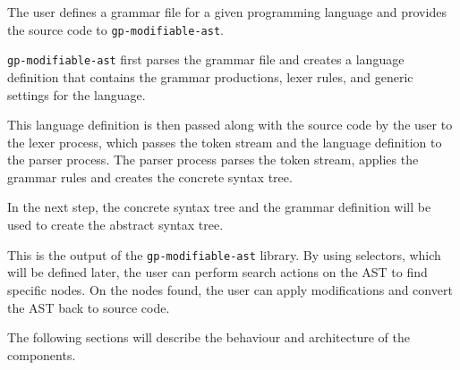 The user defines a grammar file for a given programming language and provides the source code to \verb|gp-modifiable-ast|.

\verb|gp-modifiable-ast| first parses the grammar file and creates a language definition that contains the grammar productions, lexer rules, and generic settings for the language.

This language definition is then passed along with the source code by the user to the lexer process, 
which passes the token stream and the language definition to the
parser process. The parser process parses the token stream, applies the grammar rules and creates the concrete syntax tree.

In the next step, the concrete syntax tree and the grammar definition will be used to create the abstract syntax tree.

This is the output of the \verb|gp-modifiable-ast| library. By using selectors, which will be defined later, 
the user can perform search actions on the AST to find
specific nodes. On the nodes found, the user can apply modifications and convert the AST back to source code.

The following sections will describe the behaviour and architecture of the components.